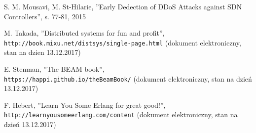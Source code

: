 \begin{thebibliography}{99}
S. M. Mousavi, M. St-Hilarie,
''Early Dedection of DDoS Attacks against SDN Controllers'',
s. 77-81, 2015

M. Takada,
''Distributed systems for fun and profit'',
\\\texttt{http://book.mixu.net/distsys/single-page.html} (dokument
elektroniczny, stan na dzien 13.12.2017)

E. Stenman,
''The BEAM book'',
\\\texttt{https://happi.github.io/theBeamBook/} (dokument elektroniczny, stan na
dzień 13.12.2017)

F. Hebert,
''Learn You Some Erlang for great good!'',
\\\texttt{http://learnyousomeerlang.com/content} (dokument elektroniczny, stan
na dzień 13.12.2017)
\end{thebibliography}